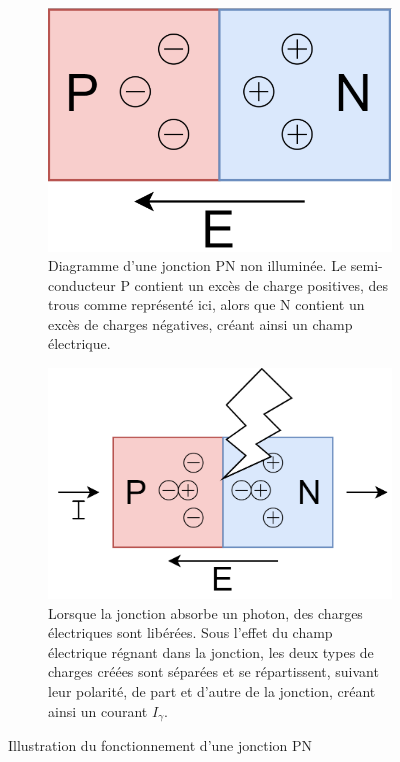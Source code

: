 \begin{figure}[h]
    \centering
    \begin{subfigure}[t]{0.45\linewidth}
        \centering
        \includegraphics[width = 0.6\linewidth]{figures/junction1.png}
        \caption{Diagramme d'une jonction PN non illuminée. Le semi-conducteur P contient un excès de charge positives, des trous comme représenté ici, alors que N contient un excès de charges négatives, créant ainsi un champ électrique.}
    \end{subfigure}
    \hfill
    \begin{subfigure}[t]{0.45\linewidth}
        \centering
        \includegraphics[width = 0.95\linewidth]{figures/junction2.png}
        \caption{Lorsque la jonction absorbe un photon, des charges électriques sont libérées. Sous l'effet du champ électrique régnant dans la jonction, les deux types de charges créées sont séparées et se répartissent, suivant leur
        polarité, de part et d'autre de la jonction, créant ainsi un courant \(I_\gamma\).}
    \end{subfigure}
    \caption{Illustration du fonctionnement d'une jonction PN \cite{nicole}}
    \label{fig:pn}
\end{figure}

